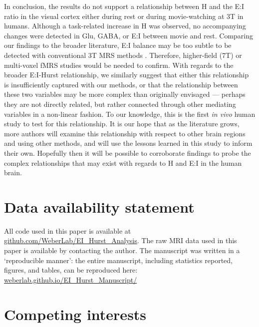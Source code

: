 \documentclass[
true
]{sn-jnl}
\begin{document}
In conclusion, the results do not support a relationship between H and
the E:I ratio in the visual cortex either during rest or during
movie-watching at 3T in humans. Although a task-related increase in H
was observed, no accompanying changes were detected in Glu, GABA, or E:I
between movie and rest. Comparing our findings to the broader
literature, E:I balance may be too subtle to be detected with
conventional 3T MRS methods
\citep{terpstraTestretestReproducibilityNeurochemical2016}. Therefore,
higher-field (7T) or multi-voxel fMRS studies would be needed to
confirm. With regards to the broader E:I-Hurst relationship, we
similarly suggest that either this relationship is insufficiently
captured with our methods, or that the relationship between these two
variables may be more complex than originally envisaged --- perhaps they
are not directly related, but rather connected through other mediating
variables in a non-linear fashion. To our knowledge, this is the first
\emph{in vivo} human study to test for this relationship. It is our hope
that as the literature grows, more authors will examine this
relationship with respect to other brain regions and using other
methods, and will use the lessons learned in this study to inform their
own. Hopefully then it will be possible to corroborate findings to probe
the complex relationships that may exist with regards to H and E:I in
the human brain.

\section*{Data availability
statement}\label{data-availability-statement}

All code used in this paper is available at
\href{https://github.com/WeberLab/EI_Hurst_Analysis}{github.com/WeberLab/EI\_Hurst\_Analysis}.
The raw MRI data used in this paper is available by contacting the
author. The manuscript was written in a `reproducible manner': the
entire manuscript, including statistics reported, figures, and tables,
can be reproduced here:
\href{https://weberlab.github.io/EI_Hurst_Manuscript/}{weberlab.github.io/EI\_Hurst\_Manuscript/}

\section*{Competing interests}\label{competing-interests}
\end{document}
